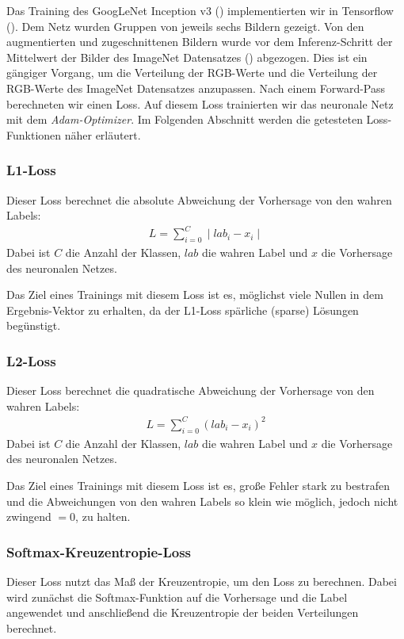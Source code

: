 	Das Training des GoogLeNet Inception v3 (\cite{inception}) implementierten wir in Tensorflow (\cite{tensorflow2015-whitepaper}). Dem Netz wurden Gruppen von jeweils sechs Bildern gezeigt. Von den augmentierten und zugeschnittenen Bildern wurde vor dem Inferenz-Schritt der Mittelwert der Bilder des ImageNet Datensatzes (\cite{russakovsky2015imagenet}) abgezogen. Dies ist ein gängiger Vorgang, um die Verteilung der RGB-Werte und die Verteilung der RGB-Werte des ImageNet Datensatzes anzupassen. Nach einem Forward-Pass berechneten wir einen Loss. Auf diesem Loss trainierten wir das neuronale Netz mit dem \textit{Adam-Optimizer}. Im Folgenden Abschnitt werden die getesteten Loss-Funktionen näher erläutert.
	
\subsubsection{L1-Loss}

	Dieser Loss berechnet die absolute Abweichung der Vorhersage von den wahren Labels:
	\begin{align*}
		L = \sum_{i = 0}^C \mid lab_i - x_i\mid
	\end{align*}
	Dabei ist $C$ die Anzahl der Klassen, $lab$ die wahren Label und $x$ die Vorhersage des neuronalen Netzes.
	
	Das Ziel eines Trainings mit diesem Loss ist es, möglichst viele Nullen in dem Ergebnis-Vektor zu erhalten, da der L1-Loss spärliche (sparse) Lösungen begünstigt.

\subsubsection{L2-Loss}
	Dieser Loss berechnet die quadratische Abweichung der Vorhersage von den wahren Labels:
	\begin{align*}
	L = \sum_{i = 0}^C ( lab_i - x_i)^2
	\end{align*}
	Dabei ist $C$ die Anzahl der Klassen, $lab$ die wahren Label und $x$ die Vorhersage des neuronalen Netzes.
	
	Das Ziel eines Trainings mit diesem Loss ist es, große Fehler stark zu bestrafen und die Abweichungen von den wahren Labels so klein wie möglich, jedoch nicht zwingend $=0$, zu halten.
	
\subsubsection{Softmax-Kreuzentropie-Loss}
	Dieser Loss nutzt das Maß der Kreuzentropie, um den Loss zu berechnen. Dabei wird zunächst die Softmax-Funktion auf die Vorhersage und die Label angewendet und anschließend die Kreuzentropie der beiden Verteilungen berechnet.
	
